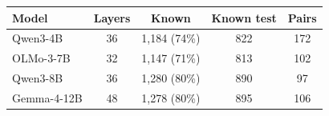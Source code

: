 \begin{tabular}{@{}lcccc@{}}
\toprule
Model & Layers & Known & Known test & Pairs \\
\midrule
Qwen3-4B & 36 & 1{,}184 (74\%) & 822 & 172 \\
OLMo-3-7B & 32 & 1{,}147 (71\%) & 813 & 102 \\
Qwen3-8B & 36 & 1{,}280 (80\%) & 890 & 97 \\
Gemma-4-12B & 48 & 1{,}278 (80\%) & 895 & 106 \\
\bottomrule
\end{tabular}
